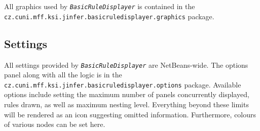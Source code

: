 \documentclass[a4paper,10pt,oneside]{article}
\newcommand{\code}[1]{\texttt{#1}}
\newcommand{\jmodule}[1]{\texttt{\textit{#1}}}
\begin{document}
All graphics used by \jmodule{BasicRuleDisplayer} is contained in the \code{cz.cuni.mff.ksi.jinfer.basicruledisplayer.graphics} package.

\subsection{Settings}

All settings provided by \jmodule{BasicRuleDisplayer} are NetBeans-wide. The options panel along with all the logic is in the \code{cz.cuni.mff.ksi.jinfer.basicruledisplayer.options} package. Available options include setting the maximum number of panels concurrently displayed, rules drawn, as well as maximum nesting level. Everything beyond these limits will be rendered as an icon suggesting omitted information. Furthermore, colours of various nodes can be set here.

\newpage


\end{document}
